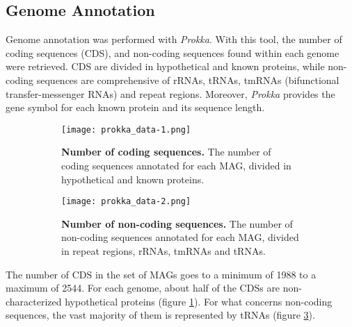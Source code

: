 \subsection*{Genome Annotation}
\graphicspath{{../Rscript/CMG_Rscript_files/figure-gfm/}}


Genome annotation was performed with \textit{Prokka}. With this tool, the number of coding sequences (CDS), and non-coding sequences found within each genome were retrieved. CDS are divided in hypothetical and known proteins, while non-coding sequences are comprehensive of rRNAs, tRNAs, tmRNAs (bifunctional transfer-messenger RNAs) and repeat regions. Moreover, \textit{Prokka} provides the gene symbol for each known protein and its sequence length.

\begin{figure}[!h]
\centering
\begin{subfigure}{0.49\textwidth}
    \centering
    \texttt{[image: prokka\_data-1.png]}
    \caption{\footnotesize{\textbf{Number of coding sequences.} The number of coding sequences annotated for each MAG, divided in hypothetical and known proteins.}}
    \label{fig:prokka1}
\end{subfigure}
\begin{subfigure}{0.49\textwidth}
    \centering
    \texttt{[image: prokka\_data-2.png]}
    \caption{\footnotesize{\textbf{Number of non-coding sequences.} The number of non-coding sequences annotated for each MAG, divided in repeat regions, rRNAs, tmRNAs and tRNAs.}}
    \label{fig:prokka2}
\end{subfigure}
\caption{}
\end{figure}

The number of CDS in the set of MAGs goes to a minimum of 1988 to a maximum of 2544. For each genome, about half of the CDSs are non-characterized hypothetical proteins (figure \ref{fig:prokka1}). For what concerns non-coding sequences, the vast majority of them is represented by tRNAs (figure \ref{fig:prokka2}).